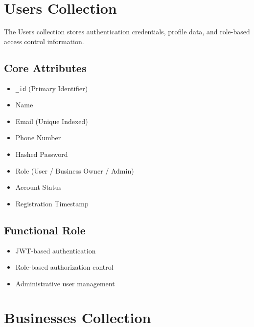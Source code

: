 \documentclass[12pt,a4paper]{report}
\begin{document}
\section{Users Collection}

The Users collection stores authentication credentials, profile data, and role-based access control information.

\subsection*{Core Attributes}

\begin{itemize}

\item \texttt{\_id} (Primary Identifier)

\item Name

\item Email (Unique Indexed)

\item Phone Number

\item Hashed Password

\item Role (User / Business Owner / Admin)

\item Account Status

\item Registration Timestamp

\end{itemize}

\subsection*{Functional Role}

\begin{itemize}

\item JWT-based authentication

\item Role-based authorization control

\item Administrative user management

\end{itemize}

\section{Businesses Collection}
\end{document}
